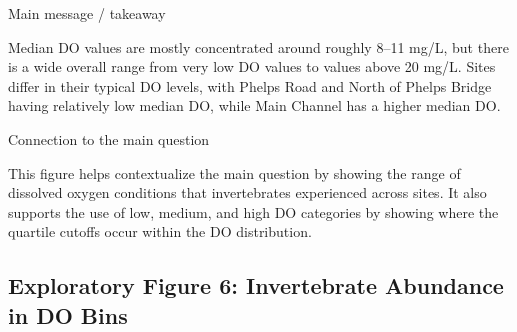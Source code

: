 \documentclass[
  letterpaper,
  DIV=11,
  numbers=noendperiod]{scrartcl}
\begin{document}
Main message / takeaway

Median DO values are mostly concentrated around roughly 8--11 mg/L, but
there is a wide overall range from very low DO values to values above 20
mg/L. Sites differ in their typical DO levels, with Phelps Road and
North of Phelps Bridge having relatively low median DO, while Main
Channel has a higher median DO.

Connection to the main question

This figure helps contextualize the main question by showing the range
of dissolved oxygen conditions that invertebrates experienced across
sites. It also supports the use of low, medium, and high DO categories
by showing where the quartile cutoffs occur within the DO distribution.

\subsection{Exploratory Figure 6: Invertebrate Abundance in DO
Bins}\label{exploratory-figure-6-invertebrate-abundance-in-do-bins}
\end{document}
